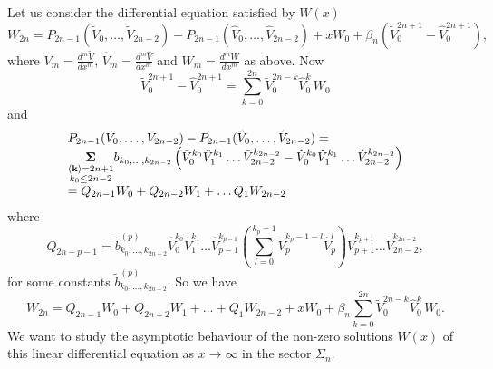 \documentclass{amsart}
\theoremstyle{definition}
\theoremstyle{remark}
\theoremstyle{remark}
\begin{document}
Let us consider the differential equation satisfied by $W(x)$
\begin{equation}
W_{2 n}= P_{2n-1}({\tilde V}_0,\dots,{\tilde V}_{2n-2})-
P_{2n-1}({\hat V}_0,\dots,{\hat V}_{2n-2}) + x W_0+
\beta_n ({\tilde V}_0^{2n+1}-{\hat V}_0^{2n+1}),
\label{diff1}\end{equation}
where ${\tilde V}_m=\frac{d^{m}\tilde V}{dx^{m}}$,
${\hat V}_m=\frac{d^{m}\hat V}{dx^{m}}$ and
$W_m=\frac{d^{m}W}{dx^{m}}$ as above.
Now
$$
{\tilde V}_0^{2n+1}-{\hat V}_0^{2n+1}
=\sum_{k=0}^{2n}{\tilde V}_0^{2n-k}{\hat V}_0^{k}\,W_0
$$
and
$$
\begin{array}{l}
P_{2n-1}({\tilde V}_0,\dots,{\tilde V}_{2n-2})-
P_{2n-1}({\hat V}_0,\dots,{\hat V}_{2n-2})= \\
\underset{{\overset{
\scriptstyle \langle{\bf k}\rangle=2n+1}{\scriptstyle k_0\leq 2n-2}}}
{{\boldsymbol{\Sigma}}}
b_{k_0,\dots,k_{2n-2}}\left({\tilde V}_0^{k_0} {\tilde V_1}^{k_1}\dots
{{\tilde V}_{2n-2}}^{k_{2n-2}}-{\hat V}_0^{k_0} {{\hat V_1}}^{k_1}\dots
{{\hat V}_{2n-2}}^{k_{2n-2}}\right)\\
=Q_{2n-1} W_0 +  Q_{2n-2} W_1 + \dots
Q_{1} W_{2n-2}\\
\end{array}
$$
where
$$
Q_{2n-p-1}=\tilde b^{(p)}_{k_0,\dots,k_{2n-2}}
{\hat V}_0^{k_0} {\hat V}_1^{k_1}\dots
{\hat V}_{p-1}^{k_{p-1}} \left(\sum_{l=0}^{k_p-1}
{\tilde V}_{p}^{k_{p}-1-l}{\hat V}_{p}^{l}\right)
{\tilde V}_{p+1}^{k_{p+1}}\dots {\tilde V}_{2n-2}^{k_{2n-2}},
$$
for some constants $\tilde b^{(p)}_{k_0,\dots,k_{2n-2}}$.
So we have
\begin{equation}
W_{2 n}= Q_{2n-1} W_0 +  Q_{2n-2} W_1 + \dots + Q_{1} W_{2n-2} + x W_0 +
\beta_n \sum_{k=0}^{2n}{\tilde V}_0^{2n-k} {\hat V}_0^{k}\,W_0.
\end{equation}
We want to study the asymptotic behaviour of the non-zero solutions
$W(x)$ of this linear differential equation as $x\to\infty$ in the
sector $\Sigma_n$.
\end{document}
